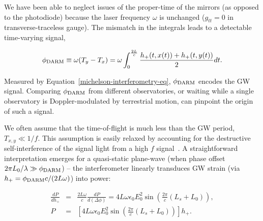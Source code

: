 \noindent We have been able to neglect issues of the proper-time of the mirrors (as opposed to the photodiode) because the laser frequency $\omega$ is unchanged ($g_{tt} = 0$ in transverse-traceless gauge).
The mismatch in the integrals leads to a detectable time-varying signal,

\begin{equation}
\phi_{\textup{DARM}} \equiv \omega (T_y - T_x) = \omega \int_0^{\frac{2L}{c}} \frac{h_+ (t, x(t)) + h_+ (t, y(t))}{2} dt.
\end{equation}  

\noindent Measured by Equation~\ref{michelson-interferometry-eq}, $\phi_{\textup{DARM}}$ encodes the GW signal.
Comparing $\phi_{\textup{DARM}}$ from different observatories, or waiting while a single observatory is Doppler-modulated by terrestrial motion, can pinpoint the origin of such a signal.

We often assume that the time-of-flight is much less than the GW period, $T_{x,y} \ll 1/f$.
This assumption is easily relaxed by accounting for the destructive self-interference of the signal light from a high $f$ signal~\cite{Saulson}.
A straightforward interpretation emerges for a quasi-static plane-wave (when phase offset $2\pi L_0/\lambda \gg \phi_\textup{DARM}$) -- the interferometer linearly transduces GW strain (via $h_+ = \phi_\textup{DARM}c/(2L\omega)$) into power:

\begin{eqnarray}
\frac{d P}{d h_+} &=& \frac{2L\omega}{c}\frac{dP}{d(\Delta\phi)} = 4 L\omega \epsilon_0 E_0^2 \sin \left(\frac{2\pi}{c} (L_s+L_0) \right),\\
P &=& \left[ 4 L \omega \epsilon_0 E_0^2 \sin \left(\frac{2\pi}{c} (L_s+L_0) \right) \right] h_+.
\label{strain-to-power-eq}
\end{eqnarray}




